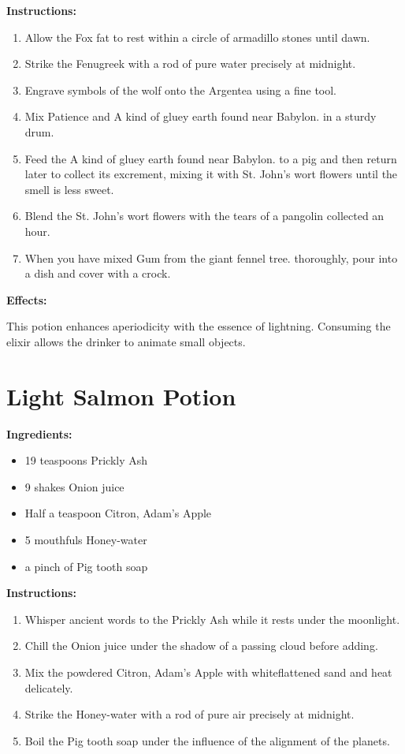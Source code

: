 \documentclass{article}
\begin{document}
\textbf{Instructions:}

\begin{enumerate}
  \item Allow the Fox fat to rest within a circle of armadillo stones until dawn.
  \item Strike the Fenugreek with a rod of pure water precisely at midnight.
  \item Engrave symbols of the wolf onto the Argentea using a fine tool.
  \item Mix Patience and A kind of gluey earth found near Babylon. in a sturdy drum.
  \item Feed the A kind of gluey earth found near Babylon. to a pig and then return later to collect its excrement, mixing it with St. John's wort flowers until the smell is less sweet.
  \item Blend the St. John's wort flowers with the tears of a pangolin collected an hour.
  \item When you have mixed Gum from the giant fennel tree. thoroughly, pour into a dish and cover with a crock.
\end{enumerate}

\textbf{Effects:}

This potion enhances aperiodicity with the essence of lightning. Consuming the elixir allows the drinker to animate small objects.

\newpage
\section*{Light Salmon Potion}

\textbf{Ingredients:}

\begin{itemize}
  \item 19 teaspoons Prickly Ash
  \item 9 shakes Onion juice
  \item Half a teaspoon Citron, Adam's Apple
  \item 5 mouthfuls Honey-water
  \item a pinch of Pig tooth soap
\end{itemize}

\textbf{Instructions:}

\begin{enumerate}
  \item Whisper ancient words to the Prickly Ash while it rests under the moonlight.
  \item Chill the Onion juice under the shadow of a passing cloud before adding.
  \item Mix the powdered Citron, Adam's Apple with whiteflattened sand and heat delicately.
  \item Strike the Honey-water with a rod of pure air precisely at midnight.
  \item Boil the Pig tooth soap under the influence of the alignment of the planets.
\end{enumerate}
\end{document}
